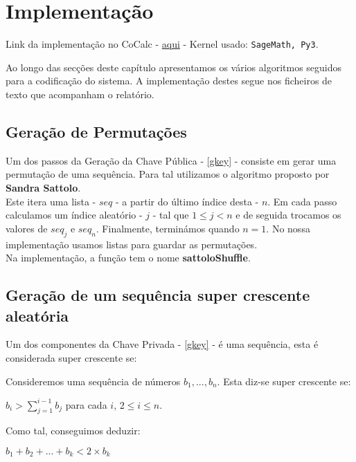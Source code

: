 \documentclass[11pt, language=portuguese]{report}
\begin{document}
\chapter{Implementação}

Link da implementação no CoCalc - \href{https://cocalc.com/share/1bede121-9d2a-477f-be2c-1dea8a3a05a6/Merkle-Hellman%20knapsack.ipynb?viewer=share}{aqui} - Kernel usado: \texttt{SageMath, Py3}.

Ao longo das secções deste capítulo apresentamos os vários algoritmos seguidos para a codificação do sistema.
A implementação destes segue nos ficheiros de texto que acompanham o relatório.

\section{Geração de Permutações}
\label{perm}

Um dos passos da Geração da Chave Pública - \ref{gkey} - consiste em gerar uma permutação de uma sequência. Para tal utilizamos o algoritmo proposto por \textbf{Sandra Sattolo}\autocite{sattolo}.\\
Este itera uma lista - $seq$ - a partir do último índice desta - $n$. Em cada passo calculamos um índice aleatório - $j$ - tal que $1 \le j < n$ e de seguida trocamos os valores de $seq_j$ e $seq_n$. Finalmente, terminámos quando $n = 1$. No nossa implementação usamos listas para guardar as permutações.\\
Na implementação, a função tem o nome \textbf{sattoloShuffle}.

\section{Geração de um sequência super crescente aleatória}
\label{seq}

Um dos componentes da Chave Privada - \ref{gkey} - é uma sequência, esta é considerada super crescente se:\\
\begin{definition}
	Consideremos uma sequência de números ${b_1, ..., b_n}$. Esta diz-se super crescente se:
	\begin{center}
		$b_i > \sum_{j = 1}^{i - 1} b_j$ para cada $i$, $2 \le i \le n$.
	\end{center}
\end{definition}

Como tal, conseguimos deduzir:

\begin{center}
	$b_1 + b_2 + ... + b_k < 2 \times b_k$
\end{center}
\end{document}
